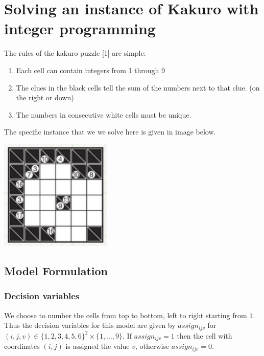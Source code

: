 \documentclass[11pt]{article}
\providecommand{\tightlist}{%
      \setlength{\itemsep}{0pt}\setlength{\parskip}{0pt}}
\begin{document}
\section{Solving an instance of Kakuro with integer
programming}\label{solving-an-instance-of-kakuro-with-integer-programming}

The rules of the kakuro puzzle {[}1{]} are simple:

\begin{enumerate}
\def\labelenumi{\arabic{enumi}.}
\tightlist
\item
  Each cell can contain integers from 1 through 9
\item
  The clues in the black cells tell the sum of the numbers next to that
  clue. (on the right or down)
\item
  The numbers in consecutive white cells must be unique.
\end{enumerate}

The specific instance that we we solve here is given in image below.

\begin{center}
	\includegraphics[width=0.4\textwidth]{images/kakuro_instance}
\end{center}

\subsection{Model Formulation}\label{model-formulation}

\subsubsection{Decision variables}\label{decision-variables}

We choose to number the cells from top to bottom, left to right starting
from \(1\). Thus the decision variables for this model are given by
\(assign_{ijv}\) for
\((i,j,v) \in \{1,2,3,4,5,6\}^2 \times \{1,\dots,9\}\). If
\(assign_{ijv} = 1\) then the cell with coordinates \((i,j)\) is
assigned the value \(v\), otherwise \(assign_{ijv} = 0\).
\end{document}
